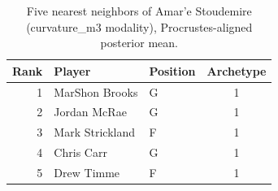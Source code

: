 \begin{table}[htbp]
  \centering\small
  \begin{tabular}{rllc}
    \toprule
    Rank & Player & Position & Archetype \\
    \midrule
    1 & MarShon Brooks & G & 1 \\
    2 & Jordan McRae & G & 1 \\
    3 & Mark Strickland & F & 1 \\
    4 & Chris Carr & G & 1 \\
    5 & Drew Timme & F & 1 \\
    \bottomrule
  \end{tabular}
  \caption{Five nearest neighbors of Amar'e Stoudemire (curvature_m3 modality), Procrustes-aligned posterior mean.}
  \label{tab:Amar_e_Stoudemire_neighbors_curvature_m3}
\end{table}

